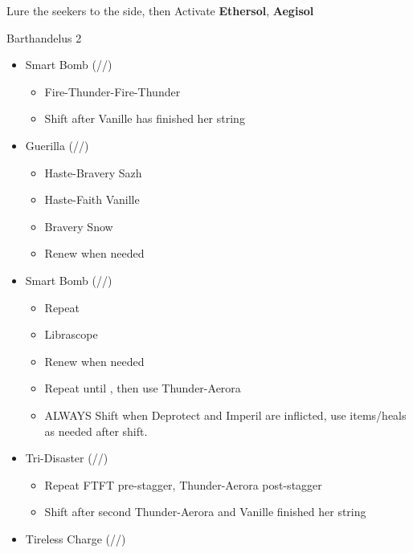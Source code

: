 Lure the seekers to the side, then 
Activate \textbf{Ethersol}, \textbf{Aegisol}
\renewcommand{\first}{[1] Tireless Charge (\com/\com/\med)}
\renewcommand{\second}{[2] Tri-Disaster (\rav/\rav/\rav)}
\renewcommand{\third}{[3] Smart Bomb (\rav/\rav/\sab)}
\renewcommand{\fourth}{[4] Aggression (\com/\com/\rav)}
\renewcommand{\fifth}{[5] Guerilla (\syn/\rav/\sab)}
\renewcommand{\sixth}{[6] Aggression (\com/\com/\rav)}
\begin{battle}{Barthandelus 2}
\begin{multicols}{2}
\begin{itemize}
    \item \third
    \begin{itemize}
        \item Fire-Thunder-Fire-Thunder
        \item Shift after Vanille has finished her string
    \end{itemize}
    \item \fifth
    \begin{itemize}
        \item Haste-Bravery Sazh
        \item Haste-Faith Vanille
        \item Bravery Snow
        \item Renew when needed
    \end{itemize}
    \item \third
    \begin{itemize}
        \item Repeat
        \item Librascope
        \item Renew when needed
        \item Repeat until \stagger, then use Thunder-Aerora
        \item ALWAYS Shift when Deprotect and Imperil are inflicted, use items/heals as needed after shift.
    \end{itemize}
    \item \second
    \begin{itemize}
        \item Repeat FTFT pre-stagger, Thunder-Aerora post-stagger
        \item Shift after second Thunder-Aerora and Vanille finished her string
    \end{itemize}
    \item \first

\end{itemize}
\end{multicols}
\end{battle}
